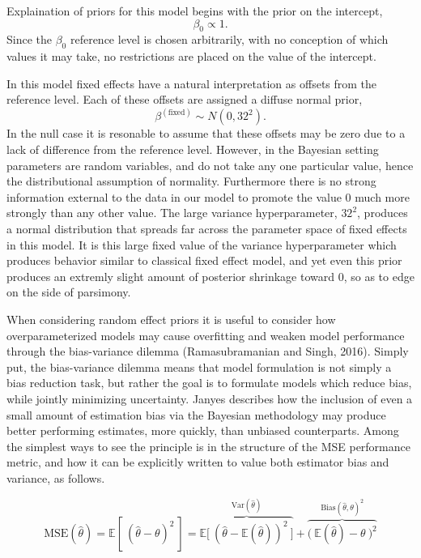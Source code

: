 \documentclass[12pt]{article}
\begin{document}
%
Explaination of priors for this model begins with the prior on the intercept, 
%
\begin{equation}
\beta_0 \propto 1.
\end{equation}
%
Since the \(\beta_0\) reference level is chosen arbitrarily, with no
conception of which values it may take, no restrictions are placed on
the value of the intercept.

%
In this model fixed effects have a natural interpretation as offsets from the 
reference level. Each of these offsets are assigned a diffuse normal prior,
%
\begin{equation}
\beta^{(\text{fixed})} \sim N(0, 32^2).
\end{equation}
%
In the null case it is resonable to assume that these offsets may be zero due 
to a lack of difference from the reference level. However, in the Bayesian 
setting parameters are random variables, and do not take any one particular 
value, hence the distributional assumption of normality. Furthermore there is 
no strong information external to the data in our model to promote the value 0 
much more strongly than any other value. The large variance hyperparameter, 
$32^2$, produces a normal distribution that spreads far across the parameter 
space of fixed effects in this model. It is this large fixed value of the 
variance hyperparameter which produces behavior similar to classical fixed 
effect model, and yet even this prior produces an extremly slight amount of 
posterior shrinkage toward 0, so as to edge on the side of parsimony.

%
When considering random effect priors it is useful to consider how 
overparameterized models may cause overfitting and weaken model performance 
through the bias-variance dilemma (Ramasubramanian and Singh, 2016). Simply 
put, the bias-variance dilemma means that model formulation is not simply a 
bias reduction task, but rather the goal is to formulate models which reduce 
bias, while jointly minimizing uncertainty. Janyes \citeyear{jaynes_probability_2003} %
describes how the inclusion of even a small amount of estimation bias via the 
Bayesian methodology may produce better performing estimates, more quickly, 
than unbiased counterparts. Among the simplest ways to see the principle is in 
the structure of the MSE performance metric, and how it can be explicitly 
written to value both estimator bias and variance, as follows.

%
\begin{equation}
\text{MSE}(\hat\theta) = \mathbb{E}\left[~(\hat\theta - \theta)^2~\right] = \overbrace{\mathbb{E}\Big[~\left(\hat\theta-\mathbb{E}(\hat\theta)\right)^2~\Big]}^{\text{Var}(\hat \theta)} + \overbrace{\Big(~\mathbb{E}(\hat\theta)-\theta~\Big)^2}^{\text{Bias}(\hat \theta, \theta)^2}
\end{equation}
\end{document}
